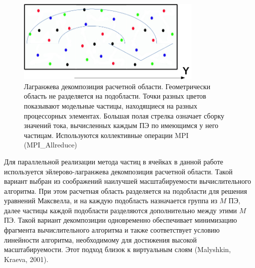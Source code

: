 \begin{figure}[ht]
	\begin{center}
		\includegraphics[height=4cm,keepaspectratio]{images/decomp_Lag.png}
	\end{center}
	\caption{Лагранжева декомпозиция расчетной области. Геометрически область не разделяется на подобласти. Точки разных цветов показывают модельные частицы, находящиеся на разных процессорных  элементах. Большая полая стрелка означает сборку значений тока, вычисленных каждым ПЭ по имеющимся у него частицам. Используются коллективные операции MPI (MPI\_Allreduce)}
	\label{Euler_dec}
\end{figure}







Для параллельной реализации метода частиц в ячейках в данной работе используется эйлерово-лагранжева декомпозиция расчетной области. Такой вариант выбран из соображений наилучшей масштабируемости вычислительного алгоритма.
При этом расчетная область разделяется на подобласти для решения уравнений Максвелла, и на каждую подобласть назначается группа из $M$ ПЭ, далее частицы каждой подобласти разделяются дополнительно между этими $M$ ПЭ. Такой вариант декомпозиции одновременно обеспечивает минимизацию фрагмента вычислительного алгоритма и также соответствует условию линейности алгоритма, необходимому для достижения высокой масштабируемости. Этот подход близок к виртуальным слоям (Malyshkin, Kraeva, 2001).



